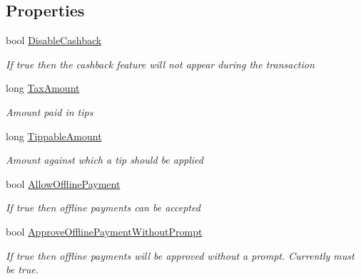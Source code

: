 \subsection*{Properties}
\begin{DoxyCompactItemize}
\item 
bool \hyperlink{classcom_1_1clover_1_1remotepay_1_1sdk_1_1_sale_request_a02447b96d94225a88f3659fa3a5f1ea4}{Disable\+Cashback}
\begin{DoxyCompactList}\small\item\em If true then the cashback feature will not appear during the transaction \end{DoxyCompactList}\item 
long \hyperlink{classcom_1_1clover_1_1remotepay_1_1sdk_1_1_sale_request_a713d87b7e697d1df24b5821a32e2345e}{Tax\+Amount}
\begin{DoxyCompactList}\small\item\em Amount paid in tips \end{DoxyCompactList}\item 
long \hyperlink{classcom_1_1clover_1_1remotepay_1_1sdk_1_1_sale_request_aad74927135a360b3b391c96160195dac}{Tippable\+Amount}
\begin{DoxyCompactList}\small\item\em Amount against which a tip should be applied \end{DoxyCompactList}\item 
bool \hyperlink{classcom_1_1clover_1_1remotepay_1_1sdk_1_1_sale_request_a3e30025cafc6b7c2a9abcbfb2b5b60ff}{Allow\+Offline\+Payment}
\begin{DoxyCompactList}\small\item\em If true then offline payments can be accepted \end{DoxyCompactList}\item 
bool \hyperlink{classcom_1_1clover_1_1remotepay_1_1sdk_1_1_sale_request_a5d441b8615062ba07c082c2392cc37eb}{Approve\+Offline\+Payment\+Without\+Prompt}
\begin{DoxyCompactList}\small\item\em If true then offline payments will be approved without a prompt. Currently must be true. \end{DoxyCompactList}\item 

\end{DoxyCompactItemize}
